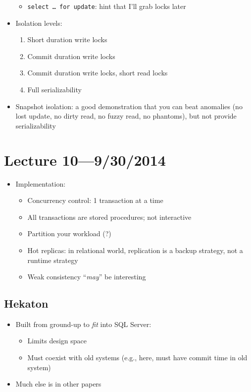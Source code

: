 \documentclass[10pt]{article}
\begin{document}
\begin{itemize}
\begin{itemize}
\item \texttt{select \dots \ for update}: hint that I'll grab locks later
\end{itemize}
\item Isolation levels:
\begin{enumerate}[start = 0]
\item Short duration write locks
\item Commit duration write locks
\item Commit duration write locks, short read locks
\item Full serializability
\end{enumerate}
\item Snapshot isolation: a good demonstration that you can beat anomalies (no lost update, no dirty
read, no fuzzy read, no phantoms), but not provide serializability
\end{itemize}

\section{Lecture 10---9/30/2014}

\begin{itemize}
\item Implementation:
\begin{itemize}
\item Concurrency control: 1 transaction at a time
\item All transactions are stored procedures; not interactive
\item Partition your workload (?)
\item Hot replicas: in relational world, replication is a backup strategy, not a runtime strategy
\item Weak consistency ``\emph{may}'' be interesting
\end{itemize}
\end{itemize}

\subsection{Hekaton}

\begin{itemize}
\item Built from ground-up to \emph{fit} into SQL Server:
\begin{itemize}
\item Limits design space
\item Must coexist with old systems (e.g., here, must have commit time in old system)
\end{itemize}
\item Much else is in other papers
\end{itemize}
\end{document}
